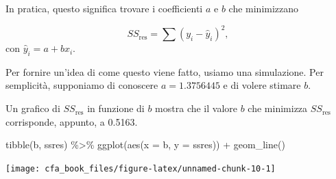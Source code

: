 \documentclass[
  11pt,
]{krantz}
\makeatletter
\newenvironment{Shaded}{\begin{snugshade}}{\end{snugshade}}
\newcommand{\AttributeTok}[1]{\textcolor[rgb]{0.61,0.61,0.61}{#1}}
\newcommand{\ConstantTok}[1]{\textcolor[rgb]{0,0,0}{#1}}
\newcommand{\ControlFlowTok}[1]{\textcolor[rgb]{0.27,0.27,0.27}{\textbf{#1}}}
\newcommand{\DecValTok}[1]{\textcolor[rgb]{0.06,0.06,0.06}{#1}}
\newcommand{\FloatTok}[1]{\textcolor[rgb]{0.06,0.06,0.06}{#1}}
\newcommand{\FunctionTok}[1]{\textcolor[rgb]{0,0,0}{#1}}
\newcommand{\NormalTok}[1]{#1}
\newcommand{\OtherTok}[1]{\textcolor[rgb]{0.37,0.37,0.37}{#1}}
\newcommand{\SpecialCharTok}[1]{\textcolor[rgb]{0,0,0}{#1}}
\newenvironment{kframe}{%
\medskip{}
\setlength{\fboxsep}{.8em}
 \def\at@end@of@kframe{}%
 \ifinner\ifhmode%
  \def\at@end@of@kframe{\end{minipage}}%
  \begin{minipage}{\columnwidth}%
 \fi\fi%
 \def\FrameCommand##1{\hskip\@totalleftmargin \hskip-\fboxsep
 \colorbox{shadecolor}{##1}\hskip-\fboxsep
     \hskip-\linewidth \hskip-\@totalleftmargin \hskip\columnwidth}%
 \MakeFramed {\advance\hsize-\width
   \@totalleftmargin\z@ \linewidth\hsize
   \@setminipage}}%
 {\par\unskip\endMakeFramed%
 \at@end@of@kframe}
\renewenvironment{Shaded}{\begin{kframe}}{\end{kframe}}
\makeatother
\begin{document}
In pratica, questo significa trovare i coefficienti \(a\) e \(b\) che minimizzano

\[
SS_{\text{res}} = \sum(y_i - \hat{y}_i)^2,
\] con \(\hat{y}_i = a + b x_i\).

Per fornire un'idea di come questo viene fatto, usiamo una simulazione. Per semplicità, supponiamo di conoscere \(a = 1.3756445\) e di volere stimare \(b\).

\begin{Shaded}
\end{Shaded}

Un grafico di \(SS_{\text{res}}\) in funzione di \(b\) mostra che il valore \(b\) che minimizza \(SS_{\text{res}}\) corrisponde, appunto, a 0.5163.

\begin{Shaded}
\begin{Highlighting}[]
\FunctionTok{tibble}\NormalTok{(b, ssres) }\SpecialCharTok{\%\textgreater{}\%}
  \FunctionTok{ggplot}\NormalTok{(}\FunctionTok{aes}\NormalTok{(}\AttributeTok{x =}\NormalTok{ b, }\AttributeTok{y =}\NormalTok{ ssres)) }\SpecialCharTok{+}
  \FunctionTok{geom\_line}\NormalTok{()}
\end{Highlighting}
\end{Shaded}

\begin{center}\texttt{[image: cfa\_book\_files/figure-latex/unnamed-chunk-10-1]} \end{center}
\end{document}
